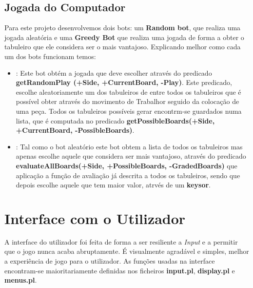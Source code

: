 \documentclass[a4paper]{article}
\begin{document}
\newpage

\subsection{Jogada do Computador}
Para este projeto desenvolvemos dois bots:  um \textbf {Random bot}, que realiza uma jogada aleatória e uma \textbf{Greedy Bot} que realiza uma jogada de forma a obter o tabuleiro que ele considera ser o mais vantajoso. Explicando melhor como cada um dos bots funcionam temos:
\begin{itemize}
 	\item \textbf{}: Este bot obtém a jogada que deve escolher através do predicado \textbf{getRandomPlay (+Side, +CurrentBoard, -Play)}. Este predicado, escolhe aleatoriamente um dos tabuleiros de entre todos os tabuleiros que é possível obter através do movimento de Trabalhor seguido da colocação de uma peça. Todos os tabuleiros possíveis gerar encontrm-se guardados numa lista, que é computada no predicado \textbf{getPossibleBoards(+Side, +CurrentBoard, -PossibleBoards)}.
	\item\textbf{}: Tal como o bot aleatório este bot obtem a lista de todos os tabuleiros mas apenas escolhe aquele que considera ser mais vantajoso, através do predicado \textbf{evaluateAllBoards(+Side, +PossibleBoards, -GradedBoards)} que aplicação a função de avaliação já descrita a todos os tabuleiros, sendo que depois escolhe aquele que tem maior valor, atrvés de um \textbf{keysor}.
\end{itemize}

\newpage

\section{Interface com o Utilizador}

A interface do utilizador foi feita de forma a ser resiliente a \textit{Input} e a permitir que o jogo nunca acaba abruptamente. É visualmente agradável e simples, melhor a experiência de jogo para o utilizador. As funções usadas na interface encontram-se maioritariamente definidas nos ficheiros \textbf{input.pl}, \textbf{display.pl} e \textbf{menus.pl}.
\end{document}
